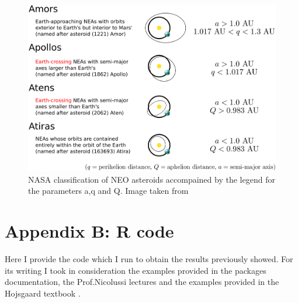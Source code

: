 \documentclass[12pt,%
               a4paper,%
               oneside,openany,%
               titlepage,%
               headinclude,footinclude,%
               BCOR5mm,%
               cleardoublepage=empty,%
               tablecaptionabove,%
               floatperchapter,
               ]{scrreprt}                 %
\begin{document}
\begin{figure}[h]
\begin{center}
\includegraphics[width=1\textwidth]{Figures/neo_orbit_types.jpg}
\caption{NASA classification of NEO asteroids accompained by the legend for the parameters a,q and Q. Image taken from \cite{nasa_classification}}
\label{neo_orbit_types}
\end{center}
\end{figure}

\chapter{Appendix B: R code} Here I provide the code which I run to obtain the results previously showed.  For its writing I took in consideration the examples provided in the  packages documentation, the Prof.Nicolussi lectures and the examples provided in the Hojsgaard textbook  \cite{hojsgaard2012graphical}. 






\newpage



\end{document}
